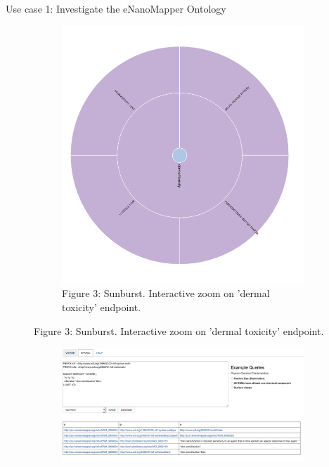 \documentclass[final]{beamer}
\begin{document}
\begin{frame}{}
\begin{textblock}{62}
\begin{block}{Use case 1: Investigate the eNanoMapper Ontology}
\begin{figure}
\begin{subfigure}[c]{0.2\textwidth}
            \includegraphics[width=\textwidth,keepaspectratio]{onto-use-case-1b.png}
            \caption{Figure 3: Sunburst. Interactive zoom on 'dermal toxicity' endpoint.}
          \end{subfigure}
        \end{figure}
        \vspace{0.05\textwidth}
        \begin{figure}
          \hspace{-0.1\textwidth}
          \begin{subfigure}[c]{0.3\textwidth}
            \includegraphics[width=\textwidth,keepaspectratio]{onto-use-case-1c.png}

\end{subfigure}
\end{figure}
\end{block}
\end{textblock}
\end{frame}
\end{document}

